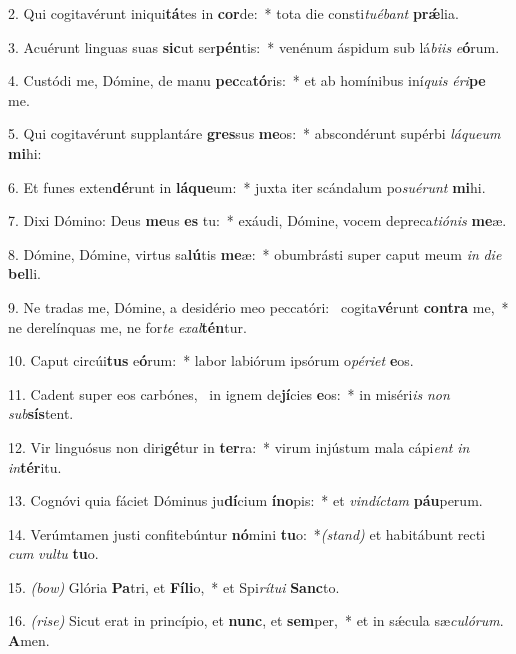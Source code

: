 2. Qui cogitavérunt iniqui\textbf{tá}tes in \textbf{cor}de:~* tota die consti\textit{tu}\textit{é}\textit{bant} \textbf{pr\'{\ae}}lia.

3. Acuérunt linguas suas \textbf{sic}ut ser\textbf{pén}tis:~* venénum áspidum sub lá\textit{bi}\textit{is} \textit{e}\textbf{ó}rum.

4. Custódi me, Dómine, de manu \textbf{pec}ca\textbf{tó}ris:~* et ab homínibus iní\textit{quis} \textit{é}\textit{ri}\textbf{pe} me.

5. Qui cogitavérunt supplantáre \textbf{gres}sus \textbf{me}os:~* abscondérunt supérbi \textit{lá}\textit{que}\textit{um} \textbf{mi}hi:

6. Et funes exten\textbf{dé}runt in \textbf{lá}\textbf{que}um:~* juxta iter scándalum po\textit{su}\textit{é}\textit{runt} \textbf{mi}hi.

7. Dixi Dómino: Deus \textbf{me}us \textbf{es} tu:~* exáudi, Dómine, vocem depreca\textit{ti}\textit{ó}\textit{nis} \textbf{me}æ.

8. Dómine, Dómine, virtus sa\textbf{lú}tis \textbf{me}æ:~* obumbrásti super caput meum \textit{in} \textit{di}\textit{e} \textbf{bel}li.

9. Ne tradas me, Dómine, a desidério meo peccatóri:~{\color{red}\GreDagger} cogita\textbf{vé}runt \textbf{con}\textbf{tra} me,~* ne derelínquas me, ne for\textit{te} \textit{ex}\textit{al}\textbf{tén}tur.

10. Caput circúi\textbf{tus} e\textbf{ó}rum:~* labor labiórum ipsórum o\textit{pé}\textit{ri}\textit{et} \textbf{e}os.

11. Cadent super eos carbónes,~{\color{red}\GreDagger} in ignem de\textbf{jí}cies \textbf{e}os:~* in miséri\textit{is} \textit{non} \textit{sub}\textbf{sís}tent.

12. Vir linguósus non diri\textbf{gé}tur in \textbf{ter}ra:~* virum injústum mala cápi\textit{ent} \textit{in} \textit{in}\textbf{tér}itu.

13. Cognóvi quia fáciet Dóminus ju\textbf{dí}cium \textbf{ín}\textbf{o}pis:~* et \textit{vin}\textit{díc}\textit{tam} \textbf{páu}perum.

14. Verúmtamen justi confitebúntur \textbf{nó}mini \textbf{tu}o:~*{\color{red}\textit{(stand)}} et habitábunt recti \textit{cum} \textit{vul}\textit{tu} \textbf{tu}o.

15. {\color{red}\textit{(bow)}} Glória \textbf{Pa}tri, et \textbf{Fí}\textbf{li}o,~* et Spi\textit{rí}\textit{tu}\textit{i} \textbf{Sanc}to.

16. {\color{red}\textit{(rise)}} Sicut erat in princípio, et \textbf{nunc}, et \textbf{sem}per,~* et in s\'{\ae}cula sæ\textit{cu}\textit{ló}\textit{rum}. \textbf{A}men.